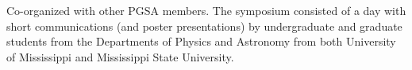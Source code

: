 \documentclass[10pt]{article}
\renewcommand{\section}[1]{\pagebreak[3]%
    \vspace{1.3\baselineskip}%
    \phantomsection\addcontentsline{toc}{section}{#1}%
    \noindent\llap{\scshape\smash{\parbox[t]{\marginparwidth}{\hyphenpenalty=10000\raggedright #1}}}%
    \vspace{-\baselineskip}\par}
\begin{document}
\begin{innerlist}
    \item Co-organized with other PGSA members.
    The symposium consisted of a day with short communications (and poster presentations)
    by undergraduate and graduate students from the Departments of Physics
    and Astronomy from both University of Mississippi and Mississippi State
    University.
\end{innerlist}





\end{document}
